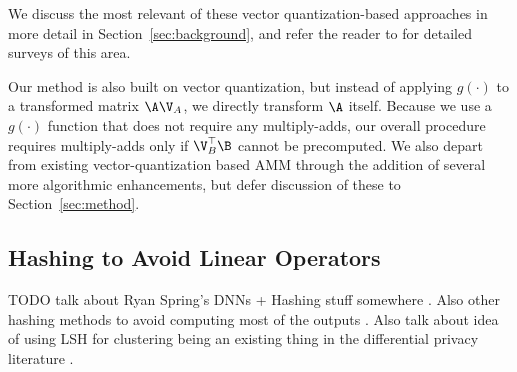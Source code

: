 We discuss the most relevant of these vector quantization-based approaches in more detail in Section~\ref{sec:background}, and refer the reader to \cite{learningToHashSurvey, hashingSimilaritySurvey} for detailed surveys of this area. %

Our method is also built on vector quantization, but instead of applying $g(\cdot)$ to a transformed matrix $\A \V_A$, we directly transform $\A$ itself. Because we use a $g(\cdot)$ function that does not require any multiply-adds, our overall procedure requires multiply-adds only if $\V_B^\top \B$ cannot be precomputed. We also depart from existing vector-quantization based AMM through the addition of several more algorithmic enhancements, but defer discussion of these to Section~\ref{sec:method}.


\subsection{Hashing to Avoid Linear Operators}

TODO talk about Ryan Spring's DNNs + Hashing stuff somewhere \cite{springScalable,slide}. Also other hashing methods to avoid computing most of the outputs \cite{wtaSoftmax,googleWtaCvpr}. Also talk about idea of using LSH for clustering being an existing thing in the differential privacy literature \cite{kmeansLshDp2017, kmeansLshDp2018, kmeansLshDp2020}.




